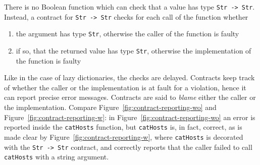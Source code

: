 \documentclass[sigplan,10pt,review,anonymous]{acmart}
\newcommand{\nickel}[1]{\lstinline[language=nickel]{#1}}
\begin{document}
There is no Boolean function which can check that a value has type
\nickel{Str -> Str}. Instead, a contract for \nickel{Str -> Str}
checks for each call of the function whether
\begin{enumerate}
\item the argument has type \nickel{Str}, otherwise the caller of the
  function is faulty
\item if so, that the returned value has type \nickel{Str}, otherwise
  the implementation of the function is faulty
\end{enumerate}

Like in the case of lazy dictionaries, the checks are delayed.
Contracts keep track of whether the caller or the implementation is
at fault for a violation, hence it can report precise error
messages. Contracts are said to \emph{blame} either the caller or the
implementation. Compare Figure~\ref{fig:contract-reporting-wo} and
Figure~\ref{fig:contract-reporting-w}: in
Figure~\ref{fig:contract-reporting-wo} an error is reported inside the
\nickel{catHosts} function, but \nickel{catHosts} is, in fact,
correct, as is made clear by Figure~\ref{fig:contract-reporting-w},
where \nickel{catHosts} is decorated with the \nickel{Str -> Str}
contract, and correctly reports that the caller failed to call
\nickel{catHosts} with a string argument.
\end{document}
